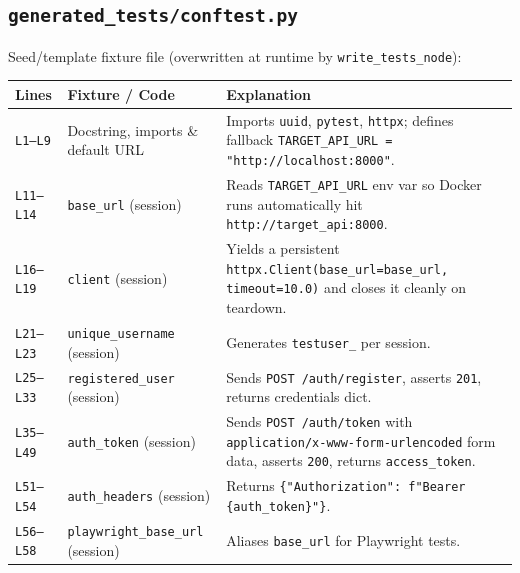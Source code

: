 \documentclass[11pt,a4paper]{article}
\begin{document}
\subsection{\texttt{generated\_tests/conftest.py}}
Seed/template fixture file (overwritten at runtime by \texttt{write\_tests\_node}):
\begin{longtable}{L{1.4cm} L{5.2cm} L{9.0cm}}
\toprule
\textbf{Lines} & \textbf{Fixture / Code} & \textbf{Explanation} \\
\midrule
\endhead
\texttt{L1--L9} & Docstring, imports \& default URL & Imports \texttt{uuid}, \texttt{pytest}, \texttt{httpx}; defines fallback \texttt{TARGET\_API\_URL = "http://localhost:8000"}. \\
\texttt{L11--L14} & \texttt{base\_url} (session) & Reads \texttt{TARGET\_API\_URL} env var so Docker runs automatically hit \texttt{http://target\_api:8000}. \\
\texttt{L16--L19} & \texttt{client} (session) & Yields a persistent \texttt{httpx.Client(base\_url=base\_url, timeout=10.0)} and closes it cleanly on teardown. \\
\texttt{L21--L23} & \texttt{unique\_username} (session) & Generates \texttt{testuser\_<8-hex-chars>} per session. \\
\texttt{L25--L33} & \texttt{registered\_user} (session) & Sends \texttt{POST /auth/register}, asserts \texttt{201}, returns credentials dict. \\
\texttt{L35--L49} & \texttt{auth\_token} (session) & Sends \texttt{POST /auth/token} with \texttt{application/x-www-form-urlencoded} form data, asserts \texttt{200}, returns \texttt{access\_token}. \\
\texttt{L51--L54} & \texttt{auth\_headers} (session) & Returns \texttt{\{"Authorization": f"Bearer \{auth\_token\}"\}}. \\
\texttt{L56--L58} & \texttt{playwright\_base\_url} (session) & Aliases \texttt{base\_url} for Playwright tests. \\
\bottomrule
\end{longtable}

\end{document}
